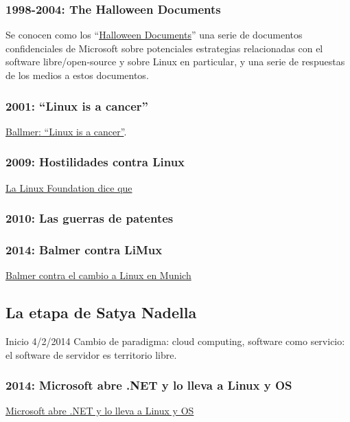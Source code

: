 \documentclass[10pt, titlepage]{article}
\begin{document}
\subsubsection{1998-2004: The Halloween Documents}
Se conocen como los ``\href{https://en.wikipedia.org/wiki/Halloween_documents}{Halloween Documents}'' una serie de documentos confidenciales de Microsoft sobre potenciales estrategias relacionadas con el software libre/open-source y sobre Linux en particular, y una serie de respuestas de los medios a estos documentos.

\subsubsection{2001: ``Linux is a cancer''}
\href{https://www.theregister.co.uk/2001/06/02/ballmer_linux_is_a_cancer/}{Ballmer: ``Linux is a cancer''}.
\subsubsection{2009: Hostilidades contra Linux}
\href {https://arstechnica.com/information-technology/2009/04/linux-foundation-says-its-time-to-ditch-microsofts-fat/}{La Linux Foundation dice que  }

\subsubsection{2010: Las guerras de patentes}

\subsubsection{2014: Balmer contra LiMux}
 \href{https://www.muycomputer.com/2014/05/16/linux-en-munich/}{Balmer contra el cambio a Linux en Munich}

\subsection{La etapa de Satya Nadella}
Inicio 4/2/2014
Cambio de paradigma: cloud computing, software como servicio: el software de servidor es territorio libre.

\subsubsection{2014: Microsoft abre .NET y lo lleva a Linux y OS}
\href{https://arstechnica.com/information-technology/2014/11/microsoft-open-sources-net-takes-it-to-linux-and-os-x/}{Microsoft abre .NET y lo lleva a Linux y OS}
\end{document}
